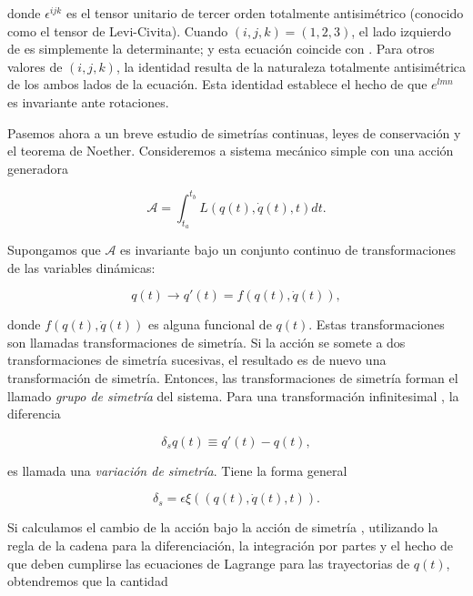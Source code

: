 \documentclass[a4paper,10pt]{article}
\numberwithin{equation}{section}
\begin{document}
donde $\epsilon^{ijk}$ es el tensor unitario de tercer orden totalmente antisimétrico (conocido 
como el tensor de Levi-Civita). Cuando $(i,j,k) = (1,2,3)$, el lado izquierdo 
de  es simplemente la determinante; y esta ecuación coincide con 
. Para otros valores de $(i,j,k)$, la identidad resulta de la naturaleza 
totalmente antisimétrica de los ambos lados de la ecuación. Esta identidad establece 
el hecho de que $e^{lmn}$ es invariante ante rotaciones. 

\vspace{.3cm}

Pasemos ahora a un breve estudio de simetrías continuas, leyes de conservación y 
el teorema de Noether. Consideremos a sistema mecánico simple con una acción 
generadora

\begin{equation}
 \mathcal{A} = \int_{t_{a}}^{t_{b}} L(q(t),\dot{q}(t),t)dt.
 \label{eq:noet1}
\end{equation}

Supongamos que $\mathcal{A}$ es invariante bajo un conjunto continuo de transformaciones 
de las variables dinámicas:

\begin{equation}
 q(t) \rightarrow q'(t) = f(q(t),\dot{q}(t)),
 \label{eq:noet2}
\end{equation}

donde $f(q(t),\dot{q}(t))$ es alguna funcional de $q(t)$. Estas transformaciones 
son llamadas transformaciones de simetría. Si la acción se somete a dos transformaciones 
de simetría sucesivas, el resultado es de nuevo una transformación de simetría. Entonces, 
las transformaciones de simetría forman el llamado \emph{grupo de simetría} del sistema. 
Para una transformación infinitesimal , la diferencia 

\begin{equation}
 \delta_s q(t) \equiv q'(t) - q(t),
 \label{eq:noet3}
\end{equation}

es llamada una \emph{variación de simetría}. Tiene la forma general 

\begin{equation}
 \delta_s = \epsilon \xi((q(t),\dot{q}(t),t)).
 \label{eq:noet4}
\end{equation}

Si calculamos el cambio de la acción bajo la acción de simetría , utilizando
la regla de la cadena para la diferenciación, la integración por partes y el hecho
de que deben cumplirse las ecuaciones de Lagrange para las trayectorias de $q(t)$, obtendremos 
que la cantidad 
\end{document}
